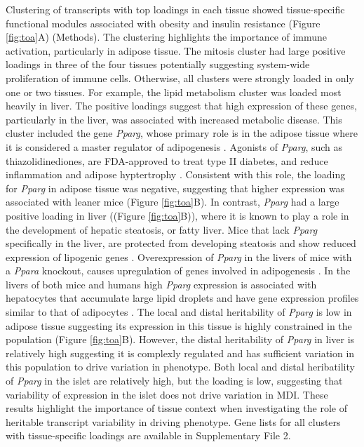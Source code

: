 \documentclass[
]{article}
\begin{document}
Clustering of transcripts with top loadings in each tissue showed
tissue-specific functional modules associated with obesity and insulin
resistance (Figure \ref{fig:toa}A) (Methods). The clustering highlights
the importance of immune activation, particularly in adipose tissue. The
mitosis cluster had large positive loadings in three of the four tissues
potentially suggesting system-wide proliferation of immune cells.
Otherwise, all clusters were strongly loaded in only one or two tissues.
For example, the lipid metabolism cluster was loaded most heavily in
liver. The positive loadings suggest that high expression of these
genes, particularly in the liver, was associated with increased
metabolic disease. This cluster included the gene \textit{Pparg}, whose
primary role is in the adipose tissue where it is considered a master
regulator of adipogenesis \cite{pmid17389767}. Agonists of
\textit{Pparg}, such as thiazolidinediones, are FDA-approved to treat
type II diabetes, and reduce inflammation and adipose hyptertrophy
\cite{pmid17389767}. Consistent with this role, the loading for
\textit{Pparg} in adipose tissue was negative, suggesting that higher
expression was associated with leaner mice (Figure \ref{fig:toa}B). In
contrast, \textit{Pparg} had a large positive loading in liver ((Figure
\ref{fig:toa}B)), where it is known to play a role in the development of
hepatic steatosis, or fatty liver. Mice that lack \textit{Pparg}
specifically in the liver, are protected from developing steatosis and
show reduced expression of lipogenic genes
\cite{pmid12805374, pmid12618528}. Overexpression of \textit{Pparg} in
the livers of mice with a \textit{Ppara} knockout, causes upregulation
of genes involved in adipogenesis \cite{pmid16357043}. In the livers of
both mice and humans high \textit{Pparg} expression is associated with
hepatocytes that accumulate large lipid droplets and have gene
expression profiles similar to that of adipocytes
\cite{pmid15644454, pmid16403437}. The local and distal heritability of
\textit{Pparg} is low in adipose tissue suggesting its expression in
this tissue is highly constrained in the population (Figure
\ref{fig:toa}B). However, the distal heritability of \textit{Pparg} in
liver is relatively high suggesting it is complexly regulated and has
sufficient variation in this population to drive variation in phenotype.
Both local and distal heribatility of \textit{Pparg} in the islet are
relatively high, but the loading is low, suggesting that variability of
expression in the islet does not drive variation in MDI. These results
highlight the importance of tissue context when investigating the role
of heritable transcript variability in driving phenotype. Gene lists for
all clusters with tissue-specific loadings are available in
Supplementary File 2.
\end{document}
